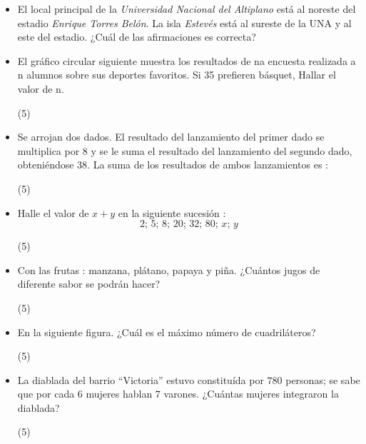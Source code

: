 \documentclass[10pt, twocolumn, landscape, a4paper]{article}
\begin{document}
\begin{itemize}
\item{El local principal de la \textit{Universidad Nacional del Altiplano} está al noreste del estadio \textit{Enrique Torres Belón}. La isla \textit{Estevés} está al sureste de la UNA y al este del estadio. ¿Cuál de las afirmaciones es correcta?
\begin{tasks}
\end{tasks}}
\item{El gráfico circular siguiente muestra los resultados de na encuesta realizada a n alumnos sobre sus deportes favoritos. Si 35 prefieren básquet, Hallar el valor de n.
\begin{tasks}(5)
\end{tasks}}
\item{Se arrojan dos dados. El resultado del lanzamiento del primer dado se multiplica por $8$ y se le suma el resultado del lanzamiento del segundo dado, obteniéndose $38$. La suma de los resultados de ambos lanzamientos es :
\begin{tasks}(5)
\end{tasks}}
\item{Halle el valor de $x + y$ en la siguiente sucesión : $$2;\,5;\,8;\,20;\,32;\,80;\,x;\,y$$
\begin{tasks}(5)
\end{tasks}}
\item{Con las frutas : manzana, plátano, papaya y piña. ¿Cuántos jugos de diferente sabor se podrán hacer?
\begin{tasks}(5)
\end{tasks}}
\item{En la siguiente figura. ¿Cuál es el máximo número de cuadriláteros?
\begin{tasks}(5)
\end{tasks}}
\item{La diablada del barrio ``Victoria'' estuvo constituída por $780$ personas; se sabe que por cada $6$ mujeres hablan $7$ varones. ¿Cuántas mujeres integraron la diablada?
\begin{tasks}(5)

\end{tasks}}
\end{itemize}
\end{document}
